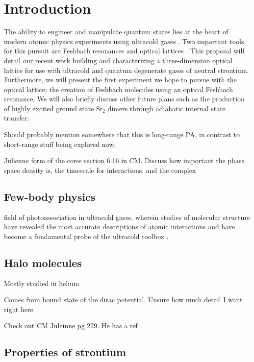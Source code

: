 \chapter{Introduction}
\label{ch:intro}

The ability to engineer and manipulate quantum states lies at the heart of modern atomic physics experiments using ultracold gases \cite{Davis1995,Anderson1995,Bradley1995,DeMarco1999,Lang2008,Ni2008}. Two important tools for this pursuit are Feshbach resonances \cite{Chin2010,Kohler2006} and optical lattices \cite{Bloch2008}. This proposal will detail our recent work building and characterizing a three-dimension optical lattice for use with ultracold and quantum degenerate gases of neutral strontium. Furthermore, we will present the first experiment we hope to pursue with the optical lattice; the creation of Feshbach molecules using an optical Feshbach resonance. We will also briefly discuss other future plans such as the production of highly excited ground state Sr$_2$ dimers through adiabatic internal state transfer.

Should probably mention somewhere that this is long-range PA, in contrast to short-range stuff being explored now.

Julienne form of the corss section 6.16 in CM. Discuss how important the phase space density is, the timescale for interactions, and the complex 

\cite{Aman2018}

\section{Few-body physics}
\label{sec:few-body}

field of photoassociation in ultracold gases, wherein studies of molecular structure have revealed the most accurate descriptions of atomic interactions and have become a fundamental probe of the ultracold toolbox \cite{Jones2006}.

\section{Halo molecules}
\label{sec:halo}

Mostly studied in helium

Comes from bound state of the dirac potential. Unsure how much detail I want right here

Check out CM Juleinne pg 229. He has a ref

\section{Properties of strontium}
\label{sec:sr}

